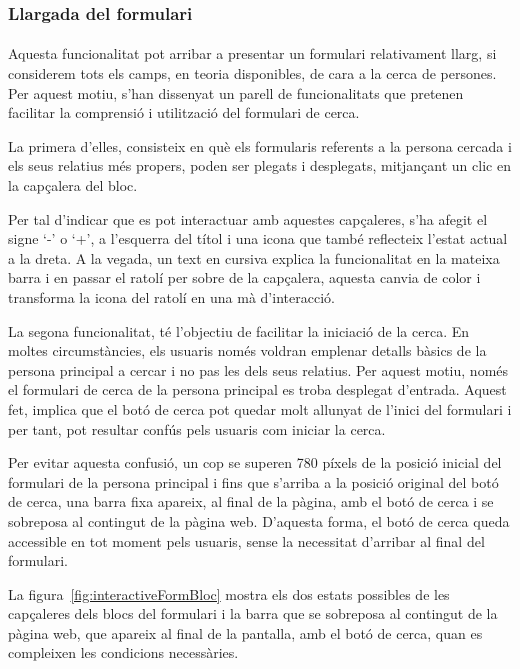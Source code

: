 \subsubsection{Llargada del formulari}

\paragraph{}
Aquesta funcionalitat pot arribar a presentar un formulari relativament llarg, si considerem tots els camps, en teoria disponibles, de cara a la cerca de persones. Per aquest motiu, s'han dissenyat un parell de funcionalitats que pretenen facilitar la comprensió i utilització del formulari de cerca.

La primera d'elles, consisteix en què els formularis referents a la persona cercada i els seus relatius més propers, poden ser plegats i desplegats, mitjançant un clic en la capçalera del bloc.

Per tal d'indicar que es pot interactuar amb aquestes capçaleres, s'ha afegit el signe `-' o `+', a l'esquerra del títol i una icona que també reflecteix l'estat actual a la dreta. A la vegada, un text en cursiva explica la funcionalitat en la mateixa barra i en passar el ratolí per sobre de la capçalera, aquesta canvia de color i transforma la icona del ratolí en una mà d'interacció.

La segona funcionalitat, té l'objectiu de facilitar la iniciació de la cerca. En moltes circumstàncies, els usuaris només voldran emplenar detalls bàsics de la persona principal a cercar i no pas les dels seus relatius. Per aquest motiu, només el formulari de cerca de la persona principal es troba desplegat d'entrada. Aquest fet, implica que el botó de cerca pot quedar molt allunyat de l'inici del formulari i per tant, pot resultar confús pels usuaris com iniciar la cerca.

Per evitar aquesta confusió, un cop se superen 780 píxels de la posició inicial del formulari de la persona principal i fins que s'arriba a la posició original del botó de cerca, una barra fixa apareix, al final de la pàgina, amb el botó de cerca i se sobreposa al contingut de la pàgina web. D'aquesta forma, el botó de cerca queda accessible en tot moment pels usuaris, sense la necessitat d'arribar al final del formulari.

La figura~\ref{fig:interactiveFormBloc} mostra els dos estats possibles de les capçaleres dels blocs del for\-mu\-la\-ri i la barra que se sobreposa al contingut de la pàgina web, que apareix al final de la pantalla, amb el botó de cerca, quan es compleixen les condicions necessàries.

